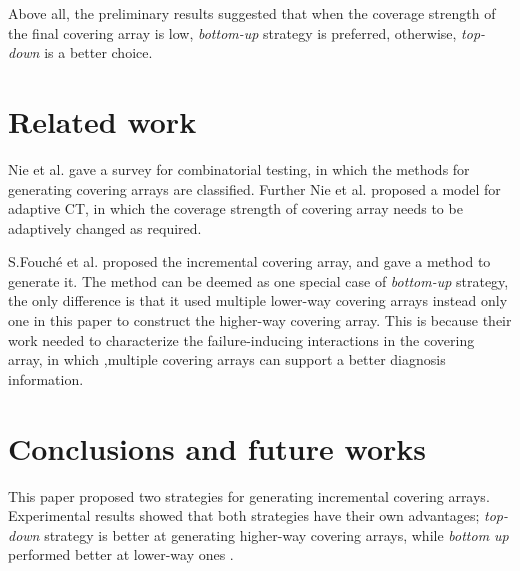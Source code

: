 \documentclass[conference]{IEEEtran}
\theoremstyle{definition}
\begin{document}
Above all, the preliminary results suggested that when the coverage strength of the final covering array is low, \emph{bottom-up} strategy is preferred, otherwise, \emph{top-down} is a better choice.


\section{Related work}
Nie et al. \cite{nie2011survey} gave a survey for combinatorial testing, in which the methods for generating covering
arrays are classified. Further Nie et al.\cite{nie2013adaptive} proposed a model for adaptive CT, in which the coverage strength of covering array needs to be adaptively changed as required.

S.Fouch{\'e}  et al. \cite{fouche2009incremental} proposed the incremental covering array, and gave a method to generate it. The method can be deemed as one special case of \emph{bottom-up} strategy, the only difference is that it used multiple lower-way covering arrays instead only one in this paper to construct the higher-way covering array. This is because their work needed to characterize the failure-inducing interactions in the covering array, in which ,multiple covering arrays can support a better diagnosis information.
%


\section{Conclusions and future works}
This paper proposed two strategies for generating incremental covering arrays. Experimental results showed that both strategies have their own advantages; \emph{top-down} strategy is better at generating higher-way covering arrays, while \emph{bottom up} performed better at lower-way ones .
\end{document}
